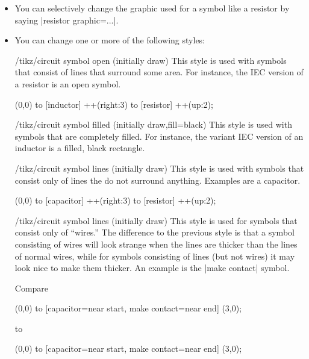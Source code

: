\begin{itemize}
\begin{codeexample}[]
\end{codeexample}
\item You can selectively change the graphic used for a symbol like a
  resistor by saying |resistor graphic=...|.
\item You can change one or more of the following styles:
  \begin{stylekey}{/tikz/circuit symbol open (initially draw)}
    This style is used with symbols that consist of lines that
    surround some area. For instance, the IEC version of a resistor is
    an open symbol. 
\begin{codeexample}[]
\tikz [circuit ee IEC,
       circuit symbol open/.style={thick,draw,fill=yellow}]
  \draw (0,0) to [inductor] ++(right:3) to [resistor] ++(up:2);
\end{codeexample}
  \end{stylekey}
  \begin{stylekey}{/tikz/circuit symbol filled (initially {draw,fill=black})}
    This style is used with symbols that are completely filled. For
    instance, the variant IEC version of an inductor is a filled,
    black rectangle. 
  \end{stylekey}
  \begin{stylekey}{/tikz/circuit symbol lines (initially draw)}
    This style is used with symbols that consist only of lines the do
    not surround anything. Examples are a capacitor.
\begin{codeexample}[]
\tikz [circuit ee IEC,
       circuit symbol lines/.style={thick,draw=red}]
  \draw (0,0) to [capacitor] ++(right:3) to [resistor] ++(up:2);
\end{codeexample}
  \end{stylekey}
  \begin{stylekey}{/tikz/circuit symbol lines (initially draw)}
    This style is used for symbols that consist only of ``wires.'' The
    difference to the previous style is that a symbol consisting of
    wires will look strange when the lines are thicker than the lines
    of normal wires, while for symbols consisting of lines (but not
    wires) it may look nice to make them thicker. An example is the
    |make contact| symbol.

    Compare 
\begin{codeexample}[]
\tikz [circuit ee IEC,circuit symbol lines/.style={draw,very thick}]
  \draw (0,0) to [capacitor={near start},
                  make contact={near end}] (3,0);
\end{codeexample}
    to 
\begin{codeexample}[]
\tikz [circuit ee IEC,circuit symbol wires/.style={draw,very thick}]
  \draw (0,0) to [capacitor={near start},
                  make contact={near end}] (3,0);
\end{codeexample}
  \end{stylekey}
\end{itemize}

